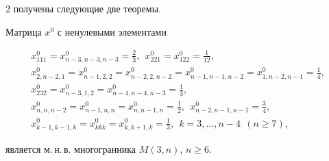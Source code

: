 2 получены следующие две теоремы.





\begin{thm}


Матрица $x^0$ с ненулевыми элементами


\begin{gather*}


x^0_{111}=x^0_{n-3,n-3,n-3}=\frac{2}{3},


\ \ x^0_{221}=x^0_{122}=\frac{1}{12},\\


%


x^0_{2,n-2,1}=x^0_{n-1,2,2}=x^0_{n-2,2,n-2}=


x^0_{n-1,n-1,n-2}=x^0_{1,n-2,n-1}=\frac{1}{4},\\


%


x^0_{232}=x^0_{n-3,1,2}=x^0_{n-4,n-4,n-3}=\frac{1}{3},\\


%


x^0_{n,n,n-2}=x^0_{n-1,n,n}=x^0_{n,n-1,n}=\frac{1}{2},


\ \ x^0_{n-2,n-1,n-1}=\frac{3}{4},\\


%


x^0_{k-1,k-1,k}=x^0_{kkk}=x^0_{k,k+1,k}=\frac{1}{3},


\ \ k=3,\dotsc,n-4\ \ (n\geq 7),


\end{gather*}


является м.\,н.\,в. многогранника $M(3,n)$, $n\geq 6$.


\end{thm}





